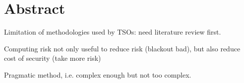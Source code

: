 \chapter*{Abstract}

Limitation of methodologies used by TSOs: need literature review first.

Computing risk not only useful to reduce risk (blackout bad), but also reduce cost of security (take more risk)

Pragmatic method, i.e. complex enough but not too complex.

